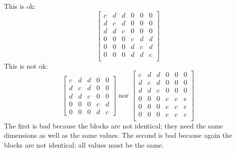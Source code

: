 \documentclass[]{article}
\begin{document}
This is ok:
\begin{equation*}
\begin{bmatrix}
c&d&d&0&0&0\\
d&c&d&0&0&0\\
d&d&c&0&0&0\\
0&0&0&c&d&d\\
0&0&0&d&c&d\\
0&0&0&d&d&c\\
\end{bmatrix}
\end{equation*}
This is not ok:
\begin{equation*}
\begin{bmatrix}
c&d&d&0&0\\
d&c&d&0&0\\
d&d&c&0&0\\
0&0&0&c&d\\
0&0&0&d&c
\end{bmatrix}
\text{ nor }
\begin{bmatrix}
c&d&d&0&0&0\\
d&c&d&0&0&0\\
d&d&c&0&0&0\\
0&0&0&c&e&e\\
0&0&0&e&c&e\\
0&0&0&e&e&c\\
\end{bmatrix}\end{equation*}
The first is bad because the blocks are not identical; they need the same dimensions as well as the same values.  The second is bad because again the blocks are not identical; all values must be the same.
\end{document}
